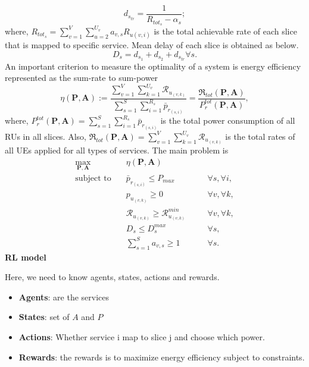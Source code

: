 \documentclass[conference]{IEEEtran}
\begin{document}
\begin{enumerate}
\begin{equation}
 d_{s_{tr}} = \frac{1}{R_{{tot}_s} - \alpha_{s}};
\end{equation}
where, $R_{{tot}_s} =  \sum_{v=1}^{V}\sum_{u=2}^{U_v}a_{v,s}R_{u(v,i)}$ is the total achievable rate of each slice that is mapped to specific service.
Mean delay of each slice is obtained as below.
\begin{equation}
D_{s} = d_{s_1} + d_{s_2} + d_{s_{tr}} \forall s.
\end{equation}
An important criterion to measure the optimality of a system is energy efficiency represented as the sum-rate to sum-power
\begin{equation}
\textstyle \eta(\boldsymbol{P},\boldsymbol{A}) := \frac{\sum\limits_{v=1}^{V} \sum\limits_{k=1}^{{U}_v}\mathcal{R}_{u_{(v,k)}} }{\sum\limits_{s=1}^{S} \sum\limits_{i=1}^{{R}_s}\bar{p}_{r_{(s,i)}}} = \frac{\mathfrak{R}_{tot}(\boldsymbol{P},\boldsymbol{A})}{P_r^{{tot}}(\boldsymbol{P},\boldsymbol{A})},
\end{equation}
where, $P_r^{tot}(\boldsymbol{P},\boldsymbol{A}) = \sum\limits_{s=1}^{S}\sum\limits_{i=1}^{{R}_s}\bar{p}_{r_{(s,i)}}$ is the total power consumption of all RUs in all slices. Also, $\mathfrak{R}_{tot}(\boldsymbol{P},\boldsymbol{A}) = \sum\limits_{v=1}^{V} \sum\limits_{k=1}^{{U}_v}\mathcal{R}_{u_{(v,k)}} $ is the total rates of all UEs applied for all types of services.
The main problem is
\begin{subequations}
\begin{alignat}{4}
\max\limits_{\boldsymbol{P}, \boldsymbol{A} }   \quad &   \eta(\boldsymbol{P},\boldsymbol{A})\\
\text{subject to} \quad  & \bar{p}_{r_{(s,i)}} \leq P_{max} && \quad \forall s, \forall i,   \\
&p_{u_{(v,k)}}  \geq 0  &&\quad \forall v, \forall k, \\
&\mathcal{R}_{u_{(v,k)}} \geq  \mathcal{R}_{u_{(v,k)}}^{min} && \quad \forall v, \forall k, \\
&D_{s} \leq D_{s}^{max}  &&\quad \forall s, \label{cc15} \\
& \textstyle  \sum_{s=1}^{S}a_{v,s} \geq 1 &&\quad \forall s.
\end{alignat}
\label{constraints1}
\end{subequations}
\textbf{RL model}

Here, we need to know agents, states, actions and rewards.
\begin{itemize}
    \item \textbf{Agents}: are the services 
    \item \textbf{States}: set of $A$ and $P$
    \item \textbf{Actions}: Whether service i map to slice j and choose which power.
    \item \textbf{Rewards}: the rewards is to maximize energy efficiency subject to constraints.
\end{itemize}

\end{enumerate}


\end{document}
